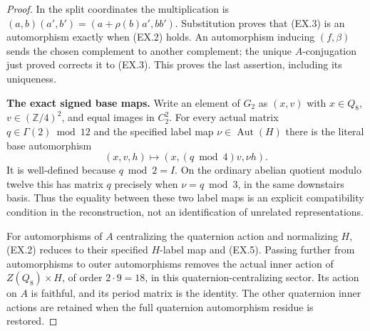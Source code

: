 \begin{proof}
In the split coordinates the multiplication is
$(a,b)(a',b')=(a+\rho(b)a',bb')$.  Substitution proves
that (EX.3) is an automorphism exactly when (EX.2)
holds.  An automorphism inducing $(f,\beta)$ sends
the chosen complement to another complement; the
unique $A$-conjugation just proved corrects it to
(EX.3).  This proves the last assertion, including
its uniqueness.
\par\medskip\noindent\textbf{The exact signed base maps.}\quad
Write an element of $G_2$ as $(x,v)$ with
$x\in Q_8$, $v\in(\mathbb Z/4)^2$, and equal images
in $C_2^2$.  For every actual matrix
$q\in\Gamma(2)\bmod12$ and the specified label map
$\nu\in\operatorname{Aut}(H)$ there is the literal
base automorphism
\[
 (x,v,h)\longmapsto(x,(q\bmod4)v,\nu h).                \tag{EX.5}
\]
It is well-defined because $q\bmod2=I$.  On the
ordinary abelian quotient modulo twelve this has
matrix $q$ precisely when $\nu=q\bmod3$, in the
same downstairs basis.  Thus the equality between
these two label maps is an explicit compatibility
condition in the reconstruction, not an identification
of unrelated representations.

For automorphisms of $A$ centralizing the quaternion
action and normalizing $H$, (EX.2) reduces to their
specified $H$-label map and (EX.5).  Passing further
from automorphisms to outer automorphisms removes
the actual inner action of $Z(Q_8)\times H$, of
order $2\cdot9=18$, in this quaternion-centralizing
sector.  Its action on $A$ is faithful, and its
period matrix is the identity.  The other quaternion
inner actions are retained when the full quaternion
automorphism residue is restored.

\end{proof}
